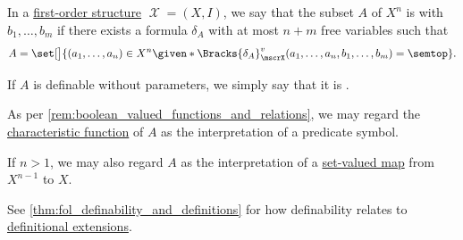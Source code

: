 \begin{definition}\label{def:fol_definability}
  In a \hyperref[def:fol_structure]{first-order structure} \( \mscrX = (X, I) \), we say that the subset \( A \) of \( X^n \) is  with  \( b_1, \ldots, b_m \) if there exists a formula \( \delta_A \) with at most \( n + m \) free variables such that
  \begin{equation*}
    A = \set[\big]{ (a_1, \ldots, a_n) \in X^n \given* \Bracks{\delta_A}_\mscrX^v(a_1, \ldots, a_n, b_1, \ldots, b_m) = \semtop }.
  \end{equation*}

  If \( A \) is definable without parameters, we simply say that it is .

  \begin{thmenum}
     As per \cref{rem:boolean_valued_functions_and_relations}, we may regard the \hyperref[def:subset_characteristic_function]{characteristic function} of \( A \) as the interpretation of a predicate symbol.

     If \( n > 1 \), we may also regard \( A \) as the interpretation of a \hyperref[def:set_valued_function]{set-valued map} from \( X^{n-1} \) to \( X \).
  \end{thmenum}
\end{definition}
\begin{comments}
  \item See \cref{thm:fol_definability_and_definitions} for how definability relates to \hyperref[def:fol_definitional_extension]{definitional extensions}.
\end{comments}


